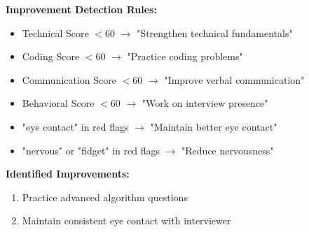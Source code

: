 \documentclass[12pt,a4paper]{article}
\begin{document}
\begin{tcolorbox}[colback=warningyellow!5,colframe=warningyellow,title=\textbf{STEP 8: Identify Areas for Improvement}]
\textbf{Improvement Detection Rules:}

\begin{itemize}
    \item Technical Score $< 60$ $\rightarrow$ "Strengthen technical fundamentals"
    \item Coding Score $< 60$ $\rightarrow$ "Practice coding problems"
    \item Communication Score $< 60$ $\rightarrow$ "Improve verbal communication"
    \item Behavioral Score $< 60$ $\rightarrow$ "Work on interview presence"
    \item "eye contact" in red flags $\rightarrow$ "Maintain better eye contact"
    \item "nervous" or "fidget" in red flags $\rightarrow$ "Reduce nervousness"
\end{itemize}

\textbf{Identified Improvements:}
\begin{enumerate}
    \item Practice advanced algorithm questions
    \item Maintain consistent eye contact with interviewer
\end{enumerate}
\end{tcolorbox}

\newpage
\end{document}
